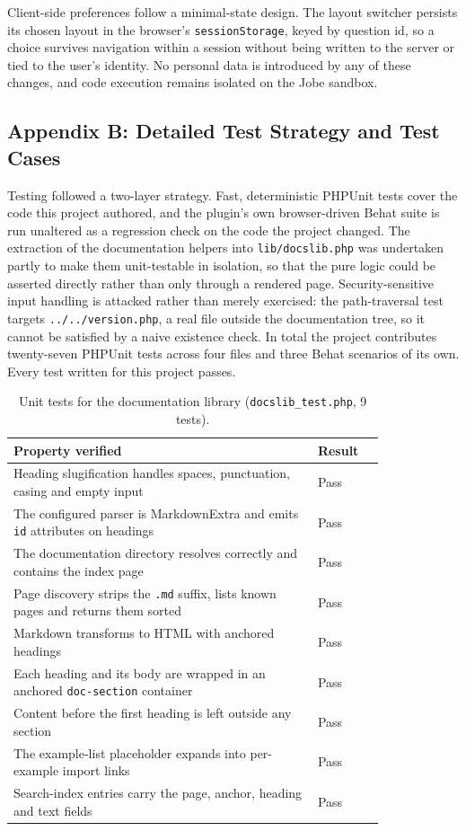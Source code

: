 Client-side preferences follow a minimal-state design. The layout switcher persists its chosen layout in the browser's \texttt{sessionStorage}, keyed by question id, so a choice survives navigation within a session without being written to the server or tied to the user's identity. No personal data is introduced by any of these changes, and code execution remains isolated on the Jobe sandbox.

\subsection{Appendix B: Detailed Test Strategy and Test Cases}

Testing followed a two-layer strategy. Fast, deterministic PHPUnit tests cover the code this project authored, and the plugin's own browser-driven Behat suite is run unaltered as a regression check on the code the project changed. The extraction of the documentation helpers into \texttt{lib/docslib.php} was undertaken partly to make them unit-testable in isolation, so that the pure logic could be asserted directly rather than only through a rendered page. Security-sensitive input handling is attacked rather than merely exercised: the path-traversal test targets \texttt{../../version.php}, a real file outside the documentation tree, so it cannot be satisfied by a naive existence check. In total the project contributes twenty-seven PHPUnit tests across four files and three Behat scenarios of its own. Every test written for this project passes.

\begin{table}[h]
\centering
\small
\begin{tabular}{@{}p{0.82\linewidth} l@{}}
\toprule
\textbf{Property verified} & \textbf{Result} \\
\midrule
Heading slugification handles spaces, punctuation, casing and empty input & Pass \\
The configured parser is MarkdownExtra and emits \texttt{id} attributes on headings & Pass \\
The documentation directory resolves correctly and contains the index page & Pass \\
Page discovery strips the \texttt{.md} suffix, lists known pages and returns them sorted & Pass \\
Markdown transforms to HTML with anchored headings & Pass \\
Each heading and its body are wrapped in an anchored \texttt{doc-section} container & Pass \\
Content before the first heading is left outside any section & Pass \\
The example-list placeholder expands into per-example import links & Pass \\
Search-index entries carry the page, anchor, heading and text fields & Pass \\
\bottomrule
\end{tabular}
\caption{Unit tests for the documentation library (\texttt{docslib\_test.php}, 9 tests).}
\label{tab:tests-docslib}
\end{table}

